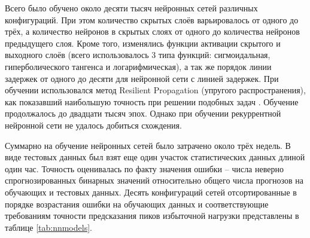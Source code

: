 \documentclass[a4paper,14pt,russian]{extreport}
\begin{document}
Всего было обучено около десяти тысяч нейронных сетей различных 
конфигураций. При этом количество скрытых слоёв варьировалось от одного до 
трёх, а количество нейронов в скрытых слоях от одного до количества нейронов 
предыдущего слоя. Кроме того, изменялись функции активации скрытого и 
выходного слоёв (всего использовалось 3 типа функций: сигмоидальная, 
гиперболического тангенса и логарифмическая), а так же порядок линии 
задержек от одного до десяти для нейронной сети с линией задержек. При 
обучении использовался метод Resilient Propagation (упругого распространения), 
как показавший наибольшую точность при решении подобных задач 
\cite{naseera2015}. Обучение продолжалось до двадцати тысяч эпох. Однако при 
обучении рекуррентной нейронной сети не удалось добиться схождения.

Суммарно на обучение нейронных сетей было затрачено около трёх недель. В 
виде тестовых данных был взят еще один участок статистических данных 
длиной один час. Точность оценивалась по факту значения ошибки -- числа 
неверно спрогнозированных бинарных значений относительно общего числа 
прогнозов на обучающих и тестовых данных. Десять конфигураций сетей 
отсортированные в порядке возрастания ошибки на обучающих данных и
соответствующие требованиям точности предсказания пиков избыточной 
нагрузки представлены в таблице \ref{tab:nnmodels}.
\end{document}
